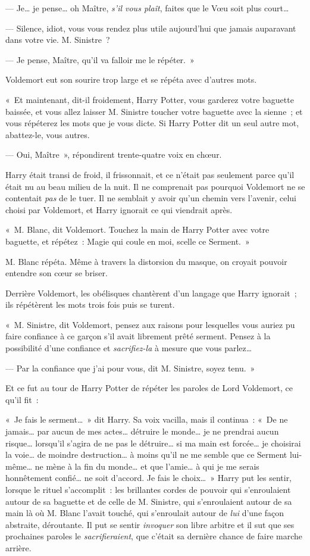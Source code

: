 --- Je… je pense… oh Maître, \emph{s'il vous plaît}, faites que le Vœu soit plus court…

--- Silence, idiot, vous vous rendez plus utile aujourd'hui que jamais auparavant dans votre vie.
M. Sinistre~?

--- Je pense, Maître, qu'il va falloir me le répéter.~»

Voldemort eut son sourire trop large et se répéta avec d'autres mots.

«~Et maintenant, dit-il froidement, Harry Potter, vous garderez votre baguette baissée, et vous allez laisser M. Sinistre toucher votre baguette avec la sienne~; et vous répéterez les mots que je vous dicte.
Si Harry Potter dit un seul autre mot, abattez-le, vous autres.

--- Oui, Maître~», répondirent trente-quatre voix en chœur.

Harry était transi de froid, il frissonnait, et ce n'était pas seulement parce qu'il était nu au beau milieu de la nuit.
Il ne comprenait pas pourquoi Voldemort ne se contentait \emph{pas} de le tuer.
Il ne semblait y avoir qu'un chemin vers l'avenir, celui choisi par Voldemort, et Harry ignorait ce qui viendrait après.

«~M. Blanc, dit Voldemort.
Touchez la main de Harry Potter avec votre baguette, et répétez~: Magie qui coule en moi, scelle ce Serment.~»

M. Blanc répéta.
Même à travers la distorsion du masque, on croyait pouvoir entendre son cœur se briser.

Derrière Voldemort, les obélisques chantèrent d'un langage que Harry ignorait~; ils répétèrent les mots trois fois puis se turent.

«~M. Sinistre, dit Voldemort, pensez aux raisons pour lesquelles vous auriez pu faire confiance à ce garçon s'il avait librement prêté serment.
Pensez à la possibilité d'une confiance et \emph{sacrifiez-la} à mesure que vous parlez…

--- Par la confiance que j'ai pour vous, dit M. Sinistre, soyez tenu.~»

Et ce fut au tour de Harry Potter de répéter les paroles de Lord Voldemort, ce qu'il fit~:

«~Je fais le serment…~»
dit Harry.
Sa voix vacilla, mais il continua~: «~De ne jamais… par aucun de mes actes… détruire le monde… je ne prendrai aucun risque… lorsqu'il s'agira de ne pas le détruire… si ma main est forcée… je choisirai la voie… de moindre destruction… à moins qu'il ne me semble que ce Serment lui-même… ne mène à la fin du monde… et que l'amie… à qui je me serais honnêtement confié… ne soit d'accord.
Je fais le choix…~»
Harry put les sentir, lorsque le rituel s'accomplit~: les brillantes cordes de pouvoir qui s'enroulaient autour de sa baguette et de celle de M. Sinistre, qui s'enroulaient autour de sa main là où M. Blanc l'avait touché, qui s'enroulait autour de \emph{lui} d'une façon abstraite, déroutante.
Il put se sentir \emph{invoquer} son libre arbitre et il sut que ses prochaines paroles le \emph{sacrifieraient}, que c'était sa dernière chance de faire marche arrière.

